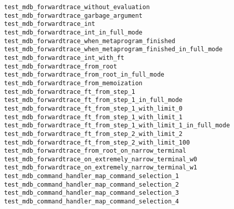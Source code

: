 \begin{description}
    \item[\texttt{test\_mdb\_forwardtrace\_without\_evaluation}]
    \item[\texttt{test\_mdb\_forwardtrace\_garbage\_argument}]
    \item[\texttt{test\_mdb\_forwardtrace\_int}]
    \item[\texttt{test\_mdb\_forwardtrace\_int\_in\_full\_mode}]
    \item[\texttt{test\_mdb\_forwardtrace\_when\_metaprogram\_finished}]
    \item[\texttt{test\_mdb\_forwardtrace\_when\_metaprogram\_finished\_in\_full\_mode}]
    \item[\texttt{test\_mdb\_forwardtrace\_int\_with\_ft}]
    \item[\texttt{test\_mdb\_forwardtrace\_from\_root}]
    \item[\texttt{test\_mdb\_forwardtrace\_from\_root\_in\_full\_mode}]
    \item[\texttt{test\_mdb\_forwardtrace\_from\_memoization}]
    \item[\texttt{test\_mdb\_forwardtrace\_ft\_from\_step\_1}]
    \item[\texttt{test\_mdb\_forwardtrace\_ft\_from\_step\_1\_in\_full\_mode}]
    \item[\texttt{test\_mdb\_forwardtrace\_ft\_from\_step\_1\_with\_limit\_0}]
    \item[\texttt{test\_mdb\_forwardtrace\_ft\_from\_step\_1\_with\_limit\_1}]
    \item[\texttt{test\_mdb\_forwardtrace\_ft\_from\_step\_1\_with\_limit\_1\_in\_full\_mode}]
    \item[\texttt{test\_mdb\_forwardtrace\_ft\_from\_step\_2\_with\_limit\_2}]
    \item[\texttt{test\_mdb\_forwardtrace\_ft\_from\_step\_2\_with\_limit\_100}]
    \item[\texttt{test\_mdb\_forwardtrace\_from\_root\_on\_narrow\_terminal}]
    \item[\texttt{test\_mdb\_forwardtrace\_on\_extremely\_narrow\_terminal\_w0}]
    \item[\texttt{test\_mdb\_forwardtrace\_on\_extremely\_narrow\_terminal\_w1}]
    \item[\texttt{test\_mdb\_command\_handler\_map\_command\_selection\_1}]
    \item[\texttt{test\_mdb\_command\_handler\_map\_command\_selection\_2}]
    \item[\texttt{test\_mdb\_command\_handler\_map\_command\_selection\_3}]
    \item[\texttt{test\_mdb\_command\_handler\_map\_command\_selection\_4}]

\end{description}
